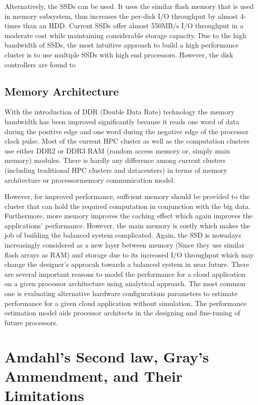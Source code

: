 \documentclass[journal]{IEEEtran}
\begin{document}
Alternatively, the SSDs can be used. It uses the similar flash
memory that is used in memory subsystem, thus increases the
per-disk I/O throughput by almost 4-times than an HDD. Current
SSDs offer almost 550MB/s I/O throughput in a moderate
cost while maintaining considerable storage capacity. Due
to the high bandwidth of SSDs, the most intuitive approach to
build a high performance cluster is to use multiple SSDs with
high end processors. However, the disk controllers are found to

\subsection{Memory Architecture}
With the introduction of DDR (Double Data Rate) technology
the memory bandwidth has been improved significantly because
it reads one word of data during the positive edge and
one word during the negative edge of the processor clock pulse.
Most of the current HPC cluster as well as the computation clusters use either DDR2 or DDR3 RAM (random access memory
or, simply main memory) modules. There is hardly any difference
among current clusters (including traditional HPC clusters
and datacenters) in terms of memory architecture or processormemory communication model. 

However, for improved performance, suffcient memory should be provided to the cluster that can hold the required computation in conjunction with the big data. Furthermore, more memory improves the caching effect which again improves the applications’ performance. However, the main memory is costly which makes the job of building the balanced system complicated. Again, the SSD is nowadays increasingly considered as a new layer between memory (Since they use similar flash arrays as RAM) and storage due to its increased I/O throughput which may change the designer’s approcah towards a balanced system in near future. There are several important reasons to model the performance for a cloud application on a given processor architecture using analytical approach. The most common one is evaluating alternative hardware configurations parameters to estimate performance for a given cloud application without simulation. The performance estimation model aids processor architects in the designing and fine-tuning of future processors.

\section{Amdahl's Second law, Gray's Ammendment, and Their Limitations} \label{Sec:AmdahlGray}
\end{document}
